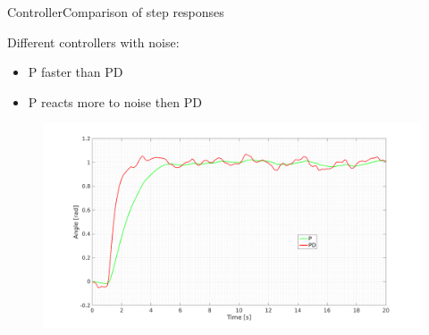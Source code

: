 \begin{frame}{Controller}{Comparison of step responses}
  \begin{block}{Different controllers with noise:}

	  \begin{itemize}
	  	\item P faster than PD
	  	\item P reacts more to noise then PD
	  \end{itemize}

	  \begin{figure}
        \includegraphics[scale=0.18]{../report/figures/PD_noise.png}
      \end{figure}
  
  \end{block}
\end{frame}

%
%
%
%
%  



